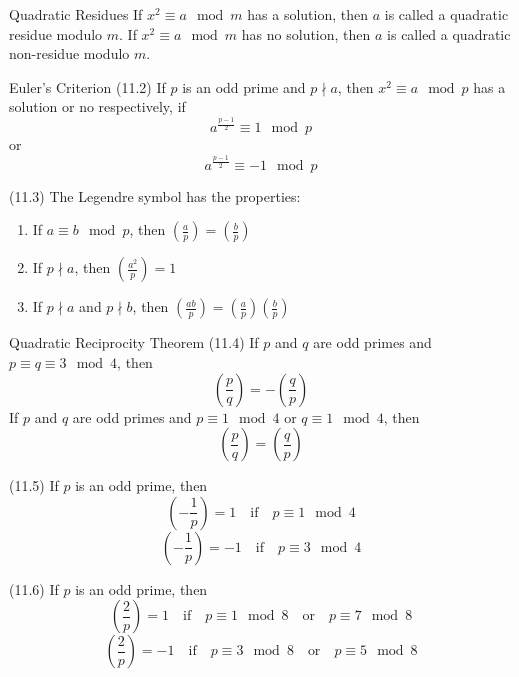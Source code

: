 \documentclass[12pt]{article}
\begin{document}
\begin{definition}{Quadratic Residues}{}
    If $ x^2 \equiv a \mod m $ has a solution, then $ a $ is called a quadratic residue modulo $ m $.
    \medskip
    \newline
    If $ x^2 \equiv a \mod m $ has no solution, then $ a $ is called a quadratic non-residue modulo $ m $.
\end{definition}
\begin{theorem}{Euler's Criterion (11.2)}{}
    If $ p $ is an odd prime and $ p \nmid a $, then $ x^2 \equiv a \mod p $ has a solution or no respectively, if
    \[ a^\frac{p - 1}{2} \equiv 1 \mod p \]
    or
    \[ a^\frac{p - 1}{2} \equiv -1 \mod p \]
\end{theorem}
\begin{theorem}{(11.3)}{}
    The Legendre symbol has the properties:
    \begin{enumerate}
        \item If $ a \equiv b \mod p $, then $ \left( \frac{a}{p} \right) = \left( \frac{b}{p} \right) $
        \item If $ p \nmid a $, then $ \left( \frac{a^2}{p} \right) = 1 $
        \item If $ p \nmid a $ and $ p \nmid b $, then $ \left( \frac{ab}{p} \right) = \left( \frac{a}{p} \right) \left( \frac{b}{p} \right) $
    \end{enumerate}
\end{theorem}
\begin{theorem}{Quadratic Reciprocity Theorem (11.4)}{}
    If $ p $ and $ q $ are odd primes and $ p \equiv q \equiv 3 \mod 4 $, then
    \[ \left( \frac{p}{q} \right) = - \left( \frac{q}{p} \right) \]
    If $ p $ and $ q $ are odd primes and $ p \equiv 1 \mod 4 $ or $ q \equiv 1 \mod 4 $, then
    \[ \left( \frac{p}{q} \right) = \left( \frac{q}{p} \right) \]
\end{theorem}
\begin{theorem}{(11.5)}{}
    If $ p $ is an odd prime, then
    \[ \left( - \frac{1}{p} \right) = 1 \quad \text{if} \quad p \equiv 1 \mod 4 \]
    \[ \left( - \frac{1}{p} \right) = -1 \quad \text{if} \quad p \equiv 3\mod 4 \]
\end{theorem}
\begin{theorem}{(11.6)}{}
    If $ p $ is an odd prime, then
    \[ \left( \frac{2}{p} \right) = 1 \quad \text{if} \quad p \equiv 1 \mod 8 \quad \text{or} \quad p \equiv 7 \mod 8 \]
    \[ \left( \frac{2}{p} \right) = -1 \quad \text{if} \quad p \equiv 3 \mod 8 \quad \text{or} \quad p \equiv 5 \mod 8 \]
\end{theorem}
\end{document}
